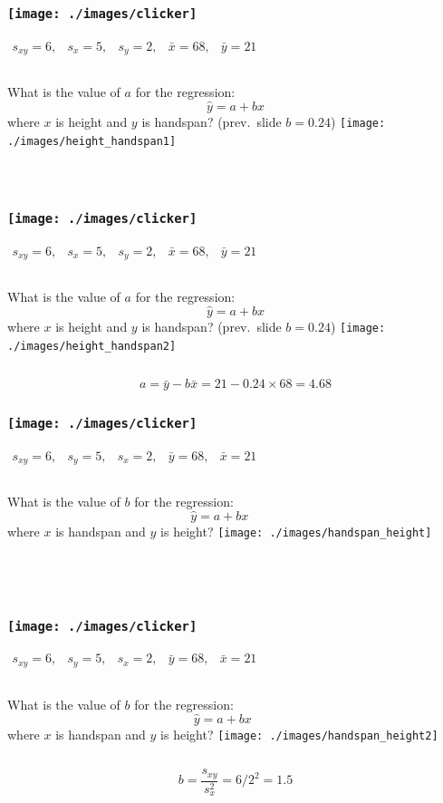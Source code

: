 \begin{frame}
\frametitle{\texttt{[image: ./images/clicker]}}
$\begin{array}{ccccc} s_{xy} = 6,&s_x = 5,& s_y = 2,& \bar{x} = 68,& \bar{y} = 21\end{array}$
\begin{columns}[c]
\column{2.5in}
What is the value of $a$ for the regression: $$\hat{y}=a+bx$$
where $x$ is height and $y$ is handspan? (prev.\ slide $b = 0.24$)
\column{1.8in}
\texttt{[image: ./images/height\_handspan1]}
\end{columns}
\alert{$$\phantom{a = \bar{y} - b \bar{x} = 20.6 - 0.297 \times 67.6 \approx 0.5}$$}
\end{frame}
\begin{frame}
\frametitle{\texttt{[image: ./images/clicker]}}
$\begin{array}{ccccc} s_{xy} = 6,&s_x = 5,& s_y = 2,& \bar{x} = 68,& \bar{y} = 21\end{array}$
\begin{columns}[c]
\column{2.5in}
What is the value of $a$ for the regression: $$\hat{y}=a+bx$$
where $x$ is height and $y$ is handspan? (prev.\ slide $b = 0.24$)
\column{1.8in}
\texttt{[image: ./images/height\_handspan2]}
\end{columns}
\alert{$$a = \bar{y} - b \bar{x} = 21 - 0.24 \times 68 = 4.68 $$}
\end{frame}
\begin{frame}
\frametitle{\texttt{[image: ./images/clicker]}}
\alert{$\begin{array}{ccccc} s_{xy} = 6,&s_y = 5,& s_x = 2,& \bar{y} = 68,& \bar{x} = 21\end{array}$}
\begin{columns}[c]
\column{2.5in}
What is the value of $b$ for the regression: $$\hat{y}=a+bx$$
where \alert{$x$ is handspan and $y$ is height? }
\column{1.8in}
\texttt{[image: ./images/handspan\_height]}
\end{columns}
\alert{$$\phantom{b = \frac{s_{xy}}{s_x^2} = 6 /2.2^2 \approx 1.2}$$}
\end{frame}
\begin{frame}
\frametitle{\texttt{[image: ./images/clicker]}}
\alert{$\begin{array}{ccccc} s_{xy} = 6,&s_y = 5,& s_x = 2,& \bar{y} = 68,& \bar{x} = 21\end{array}$}
\begin{columns}[c]
\column{2.5in}
What is the value of $b$ for the regression: $$\hat{y}=a+bx$$
where \alert{$x$ is handspan and $y$ is height? }
\column{1.8in}
\texttt{[image: ./images/handspan\_height2]}
\end{columns}
\alert{$$b = \frac{s_{xy}}{s_x^2} = 6 /2^2 = 1.5 $$}
\end{frame}
